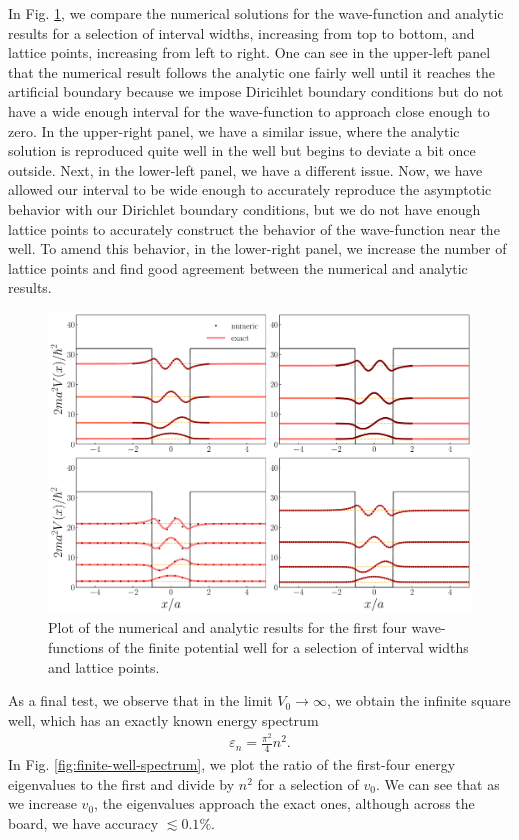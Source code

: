 In Fig. \ref{fig:finite-well-wfs}, we compare the numerical solutions for the wave-function and analytic results for a selection of interval widths, increasing from top to bottom, and lattice points, increasing from left to right.
One can see in the upper-left panel that the numerical result follows the analytic one fairly well until it reaches the artificial boundary because we impose Diricihlet boundary conditions but do not have a wide enough interval for the wave-function to approach close enough to zero.
In the upper-right panel, we have a similar issue, where the analytic solution is reproduced quite well in the well but begins to deviate a bit once outside.
Next, in the lower-left panel, we have a different issue.
Now, we have allowed our interval to be wide enough to accurately reproduce the asymptotic behavior with our Dirichlet boundary conditions, but we do not have enough lattice points to accurately construct the behavior of the wave-function near the well.
To amend this behavior, in the lower-right panel, we increase the number of lattice points and find good agreement between the numerical and analytic results.

\begin{figure}[h!tb]
    \centering
    \includegraphics[width=\linewidth]{finite_well_wfs.pdf}
    \caption{Plot of the numerical and analytic results for the first four wave-functions of the finite potential well for a selection of interval widths and lattice points.}
    \label{fig:finite-well-wfs}
\end{figure}

As a final test, we observe that in the limit $V_0 \rightarrow \infty$, we obtain the infinite square well, which has an exactly known energy spectrum
\begin{align}
    \varepsilon_{n} = \frac{\pi^2}{4} n^2
.\end{align}
In Fig. \ref{fig:finite-well-spectrum}, we plot the ratio of the first-four energy eigenvalues to the first and divide by $n^2$ for a selection of $v_0$.
We can see that as we increase $v_0$, the eigenvalues approach the exact ones, although across the board, we have accuracy $\lesssim 0.1\%$.

